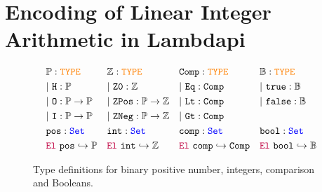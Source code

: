 \section{Encoding of Linear Integer Arithmetic in Lambdapi}
\label{sec:encoding}



\begin{figure}[bt]
\centering
\begin{align*}\label{eq:eq1}
&\bb{P}: \type & &\bb{Z}: \type   & &\tt{Comp}: \type & &\bb{B}: \type \\
&|~\tt{H} : \bb{P} & &|~\tt{Z0}: \bb{Z} & &|~\tt{Eq}: \tt{Comp} & &|~\tt{true}: \bb{B} \\
&|~\tt{O}: \bb{P} \ra \bb{P} & &|~\tt{ZPos}: \bb{P} \ra \bb{Z} & &|~\tt{Lt}: \tt{Comp} & &|~\tt{false}: \bb{B} \\
&|~\tt{I}: \bb{P} \ra \bb{P} & &|~\tt{ZNeg}: \bb{P} \ra \bb{Z} & &|~\tt{Gt}: \tt{Comp} & &\\
&\tt{pos}: \set & &\tt{int}: \set & &\tt{comp}: \set & &\tt{bool}: \set \\
&\el~\tt{pos} \re \bb{P} & &\el~\tt{int} \re \bb{Z} & &\el~\tt{comp} \re \tt{Comp} & &\el~\tt{bool} \re \bb{B}
\end{align*}
\caption{Type definitions for binary positive number, integers, comparison and Booleans.}
\label{fig:sorts-constructors}
\end{figure}

